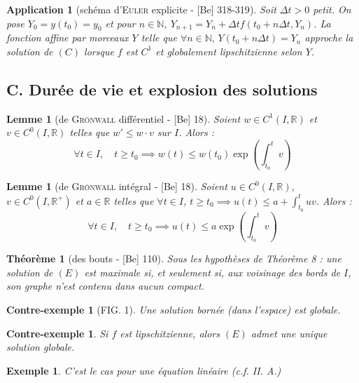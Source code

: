 \documentclass[10pt, a4paper, parskip=full, twoside, twocolumn]{report}
\newtheorem{theorem}[definition]{Théorème}
\newtheorem{lemma}[definition]{Lemme}
\newtheorem{example}[definition]{Exemple}
\newtheorem{cexample}[definition]{Contre-exemple}
\newtheorem{application}[definition]{Application}
\newcommand{\IN}{\mathbb{N}}
\newcommand{\IR}{\mathbb{R}}
\begin{document}
\begin{application}[schéma d'\textsc{Euler} explicite - \textnormal{[Be] 318-319}]
	Soit $\Delta t > 0$ petit. On pose $Y_0 = y(t_0)=y_0$ et pour $n\in\IN$, $Y_{n+1} = Y_n + \Delta t f(t_0 + n\Delta t, Y_n)$.
	La fonction affine par morceaux $Y$ telle que $\forall n\in \IN,\, Y(t_0 + n\Delta t) = Y_n$ approche la solution de $(C)$ lorsque $f$ est $C^1$ et globalement lipschitzienne selon $Y$.	
\end{application}

\subsection*{C. Durée de vie et explosion des solutions}

\begin{lemma}[de \textsc{Grönwall} différentiel - \textnormal{[Be] 18}]
	Soient $w\in C^1(I,\IR)$ et $v\in C^0(I,\IR)$ telles que $w' \leq w\cdot v$ sur $I$. Alors :
	$$\forall t\in I,\quad t\geq t_0\implies w(t)\leq w(t_0)\exp\left(\int_{t_0}^{t} v\right)$$
\end{lemma}

\begin{lemma}[de \textsc{Grönwall} intégral - \textnormal{[Be] 18}]
	Soient $u\in C^0(I,\IR)$, $v\in C^0(I,\IR^+)$ et $a\in \IR$ telles que $\forall t\in I$, $t\geq t_0\implies u(t)\leq a + \int_{t_0}^{t} uv$. Alors :
	$$\forall t\in I,\quad t\geq t_0\implies u(t)\leq a\exp\left(\int_{t_0}^{t}v\right)$$
\end{lemma}

\begin{theorem}[des bouts - \textnormal{[Be] 110}]
	Sous les hypothèses de Théorème 8 : une solution de $(E)$ est maximale si, et seulement si, aux voisinage des bords de $I$, son graphe n'est contenu dans aucun compact.
\end{theorem}

\begin{cexample}[FIG. 1]
	Une solution bornée (dans l'espace) est globale.
\end{cexample}

\begin{cexample}
	Si $f$ est lipschitzienne, alors $(E)$ admet une unique solution globale.
\end{cexample}

\begin{example}
	C'est le cas pour une équation linéaire (\emph{c.f.} II. A.)
\end{example}
\end{document}
